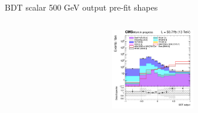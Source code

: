 \documentclass[8pt]{beamer}
\begin{document}
\begin{frame}{BDT scalar 500 GeV output pre-fit shapes}
\begin{columns}
\begin{column}{0.33\textwidth}
\begin{center}
			\begin{block}{}\end{block}	
     			\includegraphics[width=1.0\textwidth, height=100pt]{figs/2018/SmearSR-ttDM-scalar500/log_cratio_ST_topCR_ll_BDT_ttDM500_ST_BDT_output_scalar500_customBinsAttempt7.png}
    		\end{center}		
		\end{column}
\end{columns}


\end{frame}
\end{document}
